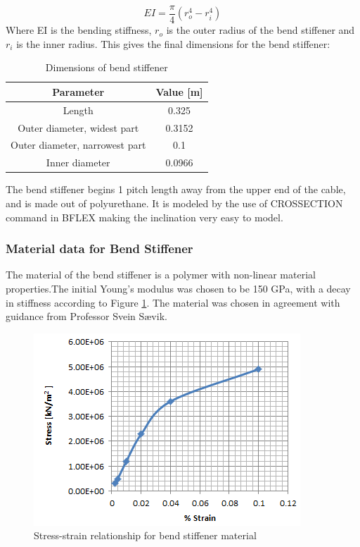  \begin{equation}
  EI = \frac{\pi}{4}(r_o^4 - r_i^4) 
\end{equation}
 Where EI is the bending stiffness, $r_o$ is the outer radius of the bend stiffener and $r_i$ is the inner radius.\newline 
\newline 
This gives the final dimensions for the bend stiffener: 
 \begin{table} [H]
\centering
\begin{tabular}{ |c|c|}
\hline
Parameter & Value [m] \\
 \hline
 \hline
 
 Length & 0.325 \\
 
Outer diameter, widest part & 0.3152\\

Outer diameter, narrowest part & 0.1\\

 Inner diameter & 0.0966 \\
 

 \hline
\end{tabular}
\caption{Dimensions of bend stiffener}
\label{table:dim}
\end{table}
\noindent The bend stiffener begins 1 pitch length away from the upper end of the cable, and is made out of polyurethane. It is modeled by the use of CROSSECTION command in BFLEX making the inclination very easy to model.  

\subsubsection{Material data for Bend Stiffener}
The material of the bend stiffener is a polymer with non-linear material properties.The initial Young's modulus was chosen to be 150 GPa, with a decay in stiffness according to  Figure \ref{fig:matbend}. The material was chosen in agreement with guidance from Professor Svein Sævik. 

\begin{figure}[H]
\centering
\includegraphics[scale=1]{figures/matbend}
\caption[$\; \:$ Stress-strain relationship for bend stiffener material]{Stress-strain relationship for bend stiffener material}
 \label{fig:matbend}
\end{figure}

